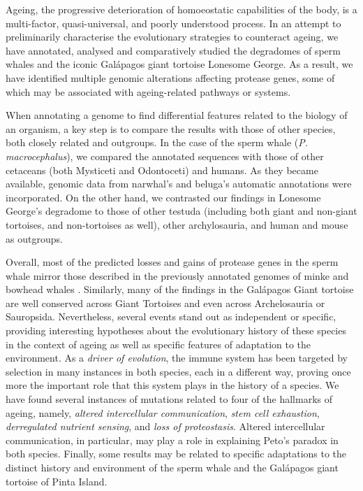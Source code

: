 Ageing, the progressive deterioration of homoeostatic capabilities of the body, is a multi-factor, quasi-universal, and poorly understood process.
In an attempt to preliminarily characterise the evolutionary strategies to counteract ageing, we have annotated, analysed and comparatively studied the degradomes of sperm whales and the iconic Gal\'{a}pagos giant tortoise Lonesome George.
As a result, we have identified multiple genomic alterations affecting protease genes, some of which may be associated with ageing-related pathways or systems.

When annotating a genome to find differential features related to the biology of an organism, a key step is to compare the results with those of other species, both closely related and outgroups.
In the case of the sperm whale (\textit{P. macrocephalus}), we compared the annotated sequences with those of other cetaceans (both Mysticeti and Odontoceti) and humans.
As they became available, genomic data from narwhal's and beluga's automatic annotations were incorporated.
On the other hand, we contrasted our findings in Lonesome George's degradome to those of other testuda (including both giant and non-giant tortoises, and non-tortoises as well), other archylosauria, and human and mouse as outgroups.

Overall, most of the predicted losses and gains of protease genes in the sperm whale mirror those described in the previously annotated genomes of minke \cite{Yim2014c} and bowhead whales \cite{Keane2015}.
Similarly, many of the findings in the Gal\'{a}pagos Giant tortoise are well conserved across Giant Tortoises and even across Archelosauria or Sauropsida.
Nevertheless, several events stand out as independent or specific, providing interesting hypotheses about the evolutionary history of these species in the context of ageing as well as specific features of adaptation to the environment.
As a \textit{driver of evolution}, the immune system has been targeted by selection in many instances in both species, each in a different way, proving once more the important role that this system plays in the history of a species. 
We have found several instances of mutations related to four of the hallmarks of ageing, namely, \textit{altered intercellular communication}, \textit{stem cell exhaustion}, \textit{derregulated nutrient sensing}, and \textit{loss of proteostasis}.
Altered intercellular communication, in particular, may play a role in explaining Peto's paradox in both species.
Finally, some results may be related to specific adaptations to the distinct history and environment of the sperm whale and the Gal\'{a}pagos giant tortoise of Pinta Island.

